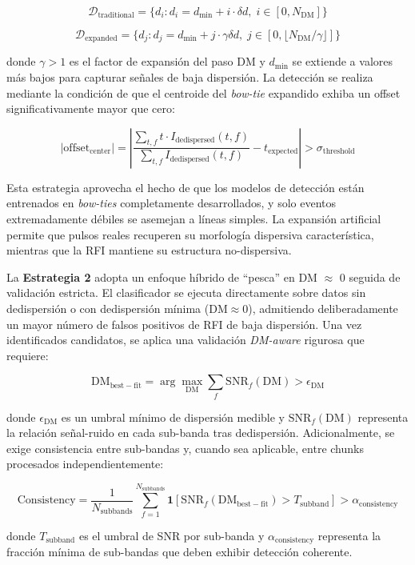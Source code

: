 \[
\mathcal{D}_{\mathrm{traditional}} = \{d_i : d_i = d_{\min} + i \cdot \delta d, \; i \in [0, N_{\mathrm{DM}}]\}
\]

\[
\mathcal{D}_{\mathrm{expanded}} = \{d_j : d_j = d_{\min} + j \cdot \gamma \delta d, \; j \in [0, \lfloor N_{\mathrm{DM}}/\gamma \rfloor]\}
\]

donde $\gamma > 1$ es el factor de expansión del paso DM y $d_{\min}$ se extiende a valores más bajos para capturar señales de baja dispersión. La detección se realiza mediante la condición de que el centroide del \textit{bow-tie} expandido exhiba un offset significativamente mayor que cero:

\[
|\mathrm{offset}_{\mathrm{center}}| = \left|\frac{\sum_{t,f} t \cdot I_{\mathrm{dedispersed}}(t,f)}{\sum_{t,f} I_{\mathrm{dedispersed}}(t,f)} - t_{\mathrm{expected}}\right| > \sigma_{\mathrm{threshold}}
\]

Esta estrategia aprovecha el hecho de que los modelos de detección están entrenados en \textit{bow-ties} completamente desarrollados, y solo eventos extremadamente débiles se asemejan a líneas simples. La expansión artificial permite que pulsos reales recuperen su morfología dispersiva característica, mientras que la RFI mantiene su estructura no-dispersiva.

La \textbf{Estrategia 2} adopta un enfoque híbrido de ``pesca'' en DM $\approx$ 0 seguida de validación estricta. El clasificador se ejecuta directamente sobre datos sin dedispersión o con dedispersión mínima ($\mathrm{DM} \approx 0$), admitiendo deliberadamente un mayor número de falsos positivos de RFI de baja dispersión. Una vez identificados candidatos, se aplica una validación \textit{DM-aware} rigurosa que requiere:

\[
\mathrm{DM}_{\mathrm{best-fit}} = \arg\max_{\mathrm{DM}} \sum_{f} \mathrm{SNR}_f(\mathrm{DM}) > \epsilon_{\mathrm{DM}}
\]

donde $\epsilon_{\mathrm{DM}}$ es un umbral mínimo de dispersión medible y $\mathrm{SNR}_f(\mathrm{DM})$ representa la relación señal-ruido en cada sub-banda tras dedispersión. Adicionalmente, se exige consistencia entre sub-bandas y, cuando sea aplicable, entre chunks procesados independientemente:

\[
\mathrm{Consistency} = \frac{1}{N_{\mathrm{subbands}}} \sum_{f=1}^{N_{\mathrm{subbands}}} \mathbf{1}[\mathrm{SNR}_f(\mathrm{DM}_{\mathrm{best-fit}}) > T_{\mathrm{subband}}] > \alpha_{\mathrm{consistency}}
\]

donde $T_{\mathrm{subband}}$ es el umbral de SNR por sub-banda y $\alpha_{\mathrm{consistency}}$ representa la fracción mínima de sub-bandas que deben exhibir detección coherente.

